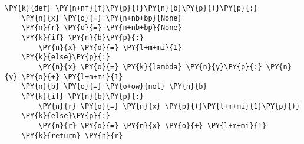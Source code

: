 \begin{Verbatim}[commandchars=\\\{\}]
\PY{k}{def} \PY{n+nf}{f}\PY{p}{(}\PY{n}{b}\PY{p}{)}\PY{p}{:}
    \PY{n}{x} \PY{o}{=} \PY{n+nb+bp}{None}
    \PY{n}{r} \PY{o}{=} \PY{n+nb+bp}{None}
    \PY{k}{if} \PY{n}{b}\PY{p}{:}
        \PY{n}{x} \PY{o}{=} \PY{l+m+mi}{1}
    \PY{k}{else}\PY{p}{:}
        \PY{n}{x} \PY{o}{=} \PY{k}{lambda} \PY{n}{y}\PY{p}{:} \PY{n}{y} \PY{o}{+} \PY{l+m+mi}{1}
    \PY{n}{b} \PY{o}{=} \PY{o+ow}{not} \PY{n}{b}
    \PY{k}{if} \PY{n}{b}\PY{p}{:}
        \PY{n}{r} \PY{o}{=} \PY{n}{x} \PY{p}{(}\PY{l+m+mi}{1}\PY{p}{)}
    \PY{k}{else}\PY{p}{:}
        \PY{n}{r} \PY{o}{=} \PY{n}{x} \PY{o}{+} \PY{l+m+mi}{1}
    \PY{k}{return} \PY{n}{r}
\end{Verbatim}
